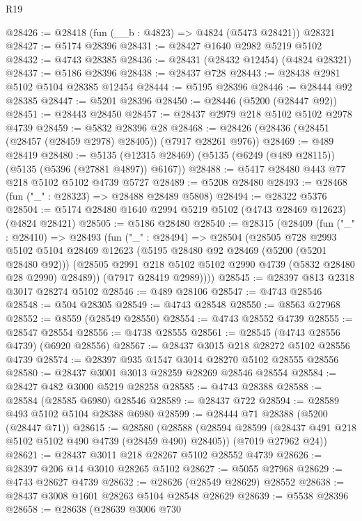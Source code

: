 \begin{lexlean}{R19}
\begin{coremodule}
{{{{{{{{{{{@28426 := @28418 (fun (__b : @4823) => @4824 (@5473 @28421)) @28321
@28427 := @5174 @28396
@28431 := @28427 @1640 @2982 @5219 @5102
@28432 := @4743 @28385
@28436 := @28431 (@28432 @12454) (@4824 @28321)
@28437 := @5186 @28396
@28438 := @28437 @728
@28443 := @28438 @2981 @5102 @5104 @28385 @12454
@28444 := @5195 @28396
@28446 := @28444 @92 @28385
@28447 := @5201 @28396
@28450 := @28446 (@5200 (@28447 @92))
@28451 := @28443 @28450
@28457 := @28437 @2979 @218 @5102 @5102 @2978 @4739
@28459 := @5832 @28396 @28
@28468 := @28426 (@28436 (@28451 (@28457 (@28459 @2978) @28405)) (@7917 @28261 @976))
@28469 := @489 @28419
@28480 := @5135 (@12315 @28469) (@5135 (@6249 (@489 @28115)) (@5135 (@5396 (@27881 @4897)) @6167))
@28488 := @5417 @28480 @443 @77 @218 @5102 @5102 @4739 @5727
@28489 := @5208 @28480
@28493 := @28468 (fun ("_" : @28323) => @28488 @28489 @5808)
@28494 := @28322 @5376
@28504 := @5174 @28480 @1640 @2994 @5219 @5102 (@4743 @28469 @12623) (@4824 @28421)
@28505 := @5186 @28480
@28540 := @28315
    (@28409
      (fun ("_" : @28410) =>
      @28493
        (fun ("_" : @28494) =>
        @28504
          (@28505
            @728
            @2993
            @5102
            @5104
            @28469
            @12623
            (@5195 @28480 @92 @28469 (@5200 (@5201 @28480 @92)))
            (@28505 @2991 @218 @5102 @5102 @2990 @4739 (@5832 @28480 @28 @2990) @28489))
          (@7917 @28419 @2989))))
@28545 := @28397 @813 @2318 @3017 @28274 @5102
@28546 := @489 @28106
@28547 := @4743 @28546
@28548 := @504 @28305
@28549 := @4743 @28548
@28550 := @8563 @27968
@28552 := @8559 (@28549 @28550)
@28554 := @4743 @28552 @4739
@28555 := @28547 @28554
@28556 := @4738 @28555
@28561 := @28545 (@4743 @28556 @4739) (@6920 @28556)
@28567 := @28437 @3015 @218 @28272 @5102 @28556 @4739
@28574 := @28397 @935 @1547 @3014 @28270 @5102 @28555 @28556
@28580 := @28437 @3001 @3013 @28259 @28269 @28546 @28554
@28584 := @28427 @482 @3000 @5219 @28258
@28585 := @4743 @28388
@28588 := @28584 (@28585 @6980) @28546
@28589 := @28437 @722
@28594 := @28589 @493 @5102 @5104 @28388 @6980
@28599 := @28444 @71 @28388 (@5200 (@28447 @71))
@28615 := @28580
    (@28588
      (@28594 @28599 (@28437 @491 @218 @5102 @5102 @490 @4739 (@28459 @490) @28405))
      (@7019 @27962 @24))
@28621 := @28437 @3011 @218 @28267 @5102 @28552 @4739
@28626 := @28397 @206 @14 @3010 @28265 @5102
@28627 := @5055 @27968
@28629 := @4743 @28627 @4739
@28632 := @28626 (@28549 @28629) @28552
@28638 := @28437 @3008 @1601 @28263 @5104 @28548 @28629
@28639 := @5538 @28396
@28658 := @28638
    (@28639
      @3006
      @730
}}}}}}}}}}}
\end{coremodule}
\end{lexlean}
